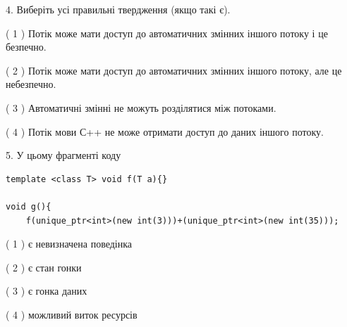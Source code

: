 \documentclass[12pt, ukrainian]{article}
\begin{document}
\begin {large}
{%
4. Виберіть усі правильні твердження (якщо такі є).\par
\vspace{2mm}

( 1 ) Потік може мати доступ до автоматичних змінних іншого потоку і це безпечно.%

( 2 ) Потік може мати доступ до автоматичних змінних іншого потоку, але це небезпечно.%

( 3 ) Автоматичні змінні не можуть розділятися між потоками.%

( 4 ) Потік мови С++ не може отримати доступ до даних іншого потоку.%


5. У цьому фрагменті коду
\begin{verbatim}
template <class T> void f(T a){}

void g(){
    f(unique_ptr<int>(new int(3)))+(unique_ptr<int>(new int(35)));
\end{verbatim}

( 1 ) є невизначена поведінка%

( 2 ) є стан гонки%

( 3 ) є гонка даних%

( 4 ) можливий виток ресурсів%
}
\end {large}
\end{document}
